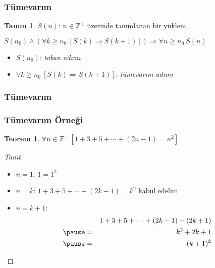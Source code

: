 \documentclass[dvipsnames]{beamer}
\theoremstyle{definition}
\newtheorem{tanim}[theorem]{Tanım}
\theoremstyle{example}
\theoremstyle{plain}
\newtheorem{teorem}[theorem]{Teorem}
\begin{document}
\begin{frame}
  \frametitle{Tümevarım}

  \begin{tanim}
    $S(n)$: $n \in \mathbb{Z}^+$ üzerinde tanımlanan bir yüklem

    \pause
    \medskip
    $S(n_0) \wedge (\forall k \geq n_0~[S(k) \Rightarrow S(k+1)])
      \Rightarrow \forall n \geq n_0~S(n)$
  \end{tanim}

  \pause
  \medskip
  \begin{itemize}
    \item $S(n_0)$: \emph{taban adımı}
    \item $\forall k \geq n_0~[S(k) \Rightarrow S(k+1)]$: \emph{tümevarım adımı}
  \end{itemize}
\end{frame}

\begin{frame}
  \frametitle{Tümevarım}

  \begin{center}
  \end{center}
\end{frame}

\begin{frame}
  \frametitle{Tümevarım Örneği}

  \begin{teorem}
    $\forall n \in \mathbb{Z}^+~[1+3+5+\cdots+(2n-1)=n^2]$
  \end{teorem}

  \pause
  \begin{proof}[Tanıt]
    \begin{itemize}
      \item $n=1$: $1=1^2$

      \pause
      \item $n=k$: $1+3+5+\cdots+(2k-1)=k^2$ kabul edelim

      \pause
      \item $n=k+1$:
      \begin{eqnarray*}
        &   & 1+3+5+\cdots+(2k-1)+(2k+1)\\\pause
        & = & k^2+2k+1\\\pause
        & = & (k+1)^2
      \end{eqnarray*}
    \end{itemize}
  \end{proof}
\end{frame}
\end{document}
